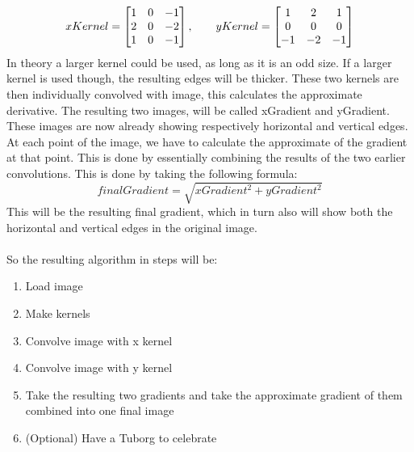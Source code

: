 	\[
	xKernel = 
	\begin{bmatrix}
		1 & 0 & -1\\
		2 & 0 & -2\\
		1 & 0 & -1
	\end{bmatrix},\hspace{0.7cm}
	yKernel = 
	\begin{bmatrix}
	1 & 2 & 1\\
	0 & 0 & 0\\
	-1 & -2 & -1
	\end{bmatrix}
	\]
	In theory a larger kernel could be used, as long as it is an odd size. If a larger kernel is used though, the resulting edges will be thicker.
	These two kernels are then individually convolved with image, this calculates the approximate derivative. The resulting two images, will be called xGradient and yGradient. These images are now already showing respectively horizontal and vertical edges.\newpage
	At each point of the image, we have to calculate the approximate of the gradient at that point. This is done by essentially combining the results of the two earlier convolutions. This is done by taking the following formula:
	\[
	finalGradient = \sqrt{xGradient^2+yGradient^2}
	\]
	This will be the resulting final gradient, which in turn also will show both the horizontal and vertical edges in the original image.\\
	\\
	So the resulting algorithm in steps will be:
	\begin{enumerate}
		\item Load image
		\item Make kernels
		\item Convolve image with x kernel
		\item Convolve image with y kernel
		\item Take the resulting two gradients and take the approximate gradient of them combined into one final image
		\item (Optional) Have a Tuborg to celebrate
	\end{enumerate}